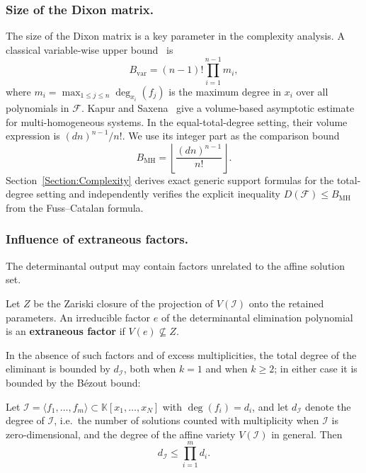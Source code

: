 \subsubsection{Size of the Dixon matrix.}
The size of the Dixon matrix is a key parameter in the complexity analysis. A classical variable-wise upper bound~\cite{DBLP:conf/issac/KapurSY94,DBLP:journals/ijcm/QinWTJ17} is
\begin{equation}
	B_{\mathrm{var}} = (n-1)! \prod_{i=1}^{n-1} m_i,
	\label{eq:Dixon_var_bound}
\end{equation}
where $m_i = \max_{1\leq j\leq n}\deg_{x_i}(f_j)$ is the maximum degree in $x_i$ over all polynomials in $\mathcal{F}$. Kapur and Saxena~\cite[Theorem~4.3]{DBLP:conf/stoc/KapurS96} give a volume-based asymptotic estimate for multi-homogeneous systems. In the equal-total-degree setting, their volume expression is $(dn)^{n-1}/n!$. We use its integer part as the comparison bound
\begin{equation}
	B_{\mathrm{MH}} = \left\lfloor \frac{(dn)^{n-1}}{n!} \right\rfloor.
	\label{eq:Dixon_volume_bound}
\end{equation}
Section~\ref{Section:Complexity} derives exact generic support formulas for the total-degree setting and independently verifies the explicit inequality $D(\mathcal{F})\le B_{\mathrm{MH}}$ from the Fuss--Catalan formula.

\subsubsection{Influence of extraneous factors.}
The determinantal output may contain factors unrelated to the affine solution set.

\begin{definition}\label{def:extra_factor}
	Let $Z$ be the Zariski closure of the projection of $V(\mathcal{I})$ onto the retained parameters. An irreducible factor $e$ of the determinantal elimination polynomial is an \textbf{extraneous factor} if $V(e)\not\subseteq Z$.
\end{definition}

In the absence of such factors and of excess multiplicities, the total degree of the eliminant is bounded by $d_{\mathcal{I}}$, both when $k=1$ and when $k\ge 2$; in either case it is bounded by the B\'ezout bound:

\begin{theorem}\label{thm:bezout_bound}
	Let $\mathcal{I} = \langle f_1, \ldots, f_m \rangle \subset \mathbb{K}[x_1, \ldots, x_N]$ with $\deg(f_i)=d_i$, and let $d_{\mathcal{I}}$ denote the degree of $\mathcal{I}$, i.e.\ the number of solutions counted with multiplicity when $\mathcal{I}$ is zero-dimensional, and the degree of the affine variety $V(\mathcal{I})$ in general. Then
	\[
	d_{\mathcal{I}} \leq \prod_{i=1}^m d_i.
	\]
\end{theorem}


